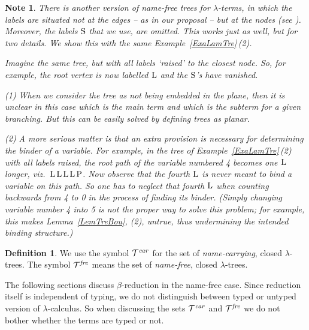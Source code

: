 \documentclass{article}
\theoremstyle{plain}
\newtheorem{Note}[The]{Note}
\theoremstyle{definition}
\newtheorem{Def}[The]{Definition}
\begin{document}
\begin{Note}
There is another version of name-free trees for $\lambda$-terms, in which the labels are situated not at the edges -- as in our proposal -- but at the {\it nodes\/} (see \citealp{deB78a}). Moreover, the labels ${\rm S}$ that we use, are omitted. This works just as well, but for two details. We show this with the same Example~\ref{ExaLamTre}\,(2).

Imagine the same tree, but with all labels `raised' to the closest node. So, for example, the root vertex is now labelled ${\rm L}$ and the ${\rm S}$'s have vanished. %

(1) When we consider the tree as not being embedded in the plane, then it is unclear in this case which is the main term and which is the subterm for a given branching. But this can be easily solved by defining trees as planar.

(2) A more serious matter is that an extra provision is necessary for determining the binder of a variable. For example, in the tree of Example~\ref{ExaLamTre}\,(2) with all labels raised, the root path of the variable numbered 4 becomes one ${\rm L}$ longer, viz.\ ${\rm L} \, {\rm L} \, {\rm L} \, {\rm L} \, {\rm P}$. Now observe that the fourth ${\rm L}$ is never meant to bind a variable on this path. So one has to neglect that fourth ${\rm L}$ when counting backwards from 4 to 0 in the process of finding its binder. (Simply changing variable number 4 into 5 is not the proper way to solve this problem; for example, this makes Lemma~\ref{LemTreBou}, (2), untrue, thus undermining the intended binding structure.)
\end{Note}

\begin{Def}
We use the symbol ${\cal T}^{\it car}$ for the set of {\it name-carrying\/}, closed $\lambda$-trees. The symbol ${\cal T}^{\it fre}$ means the set of {\it name-free\/}, closed $\lambda$-trees.
\end{Def}

The following sections discuss $\beta$-reduction in the name-free case. Since reduction itself is independent of typing, we do not distinguish between typed or untyped version of $\lambda$-calculus. So when discussing the sets ${\cal T}^{\it car}$ and ${\cal T}^{\it fre}$ we do not bother whether the terms are typed or not.


\end{document}
